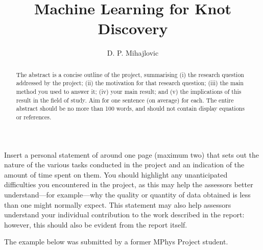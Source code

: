 \documentclass[12pt]{article}
\begin{document}
\title{Machine Learning for Knot Discovery} %
\author{D. P. Mihajlovic} %
\date{} %

\begin{abstract}
The abstract is a concise outline of the project, summarising (i) the research question addressed by the project; (ii) the motivation for that research question; (iii) the main method you used to answer it; (iv) your main result; and (v) the implications of this result in the field of study. Aim for one sentence (on average) for each. The entire abstract should be no more than 100 words, and should not contain display equations or references.
\end{abstract}

\maketitle

\personalstatement

\begin{it}

Insert a personal statement of around one page (maximum two) that sets out the nature of the various tasks conducted in the project and an indication of the amount of time spent on them. You should highlight any unanticipated difficulties you encountered in the project, as this may help the assessors better understand---for example---why the quality or quantity of data obtained is less than one might normally expect. This statement may also help assessors understand your individual contribution to the work described in the report: however, this should also be evident from the report itself.

The example below was submitted by a former MPhys Project student.

\end{it}

\end{document}
